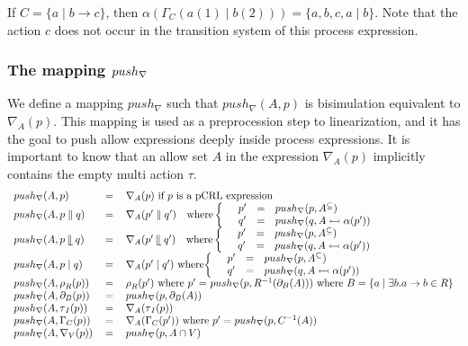 \documentclass{article}
\begin{document}
If $C=\{a\mid b\rightarrow c\}$, then $\alpha (\Gamma _{C}(a(1)\mid
b(2)))=\{a,b,c,a\mid b\}$. Note that the action $c$ does not occur in the
transition system of this process expression.

\subsubsection{The mapping $push_{\protect\nabla }$}

We define a mapping $push_{\nabla }$ such that $push_{\nabla }(A,p)$ is
bisimulation equivalent to $\nabla _{A}(p)$. This mapping is used as a
preprocession step to linearization, and it has the goal to push allow
expressions deeply inside process expressions. It is important to know that
an allow set $A$ in the expression $\nabla _{A}(p)$ implicitly contains the
empty multi action $\tau $.%
\[
\begin{tabular}{lll}
$push_{\nabla }(A,p)$ & $=$ & $\nabla _{A}(p)$ if $p$ is a pCRL expression
\\ 
$push_{\nabla }(A,p\parallel q)$ & $=$ & $\nabla _{A}(p^{\prime }\parallel
q^{\prime })\text{ where}\left\{ \text{ }%
\begin{array}{lll}
p^{\prime } & = & push_{\nabla }(p,A^{\subseteq }) \\ 
q^{\prime } & = & push_{\nabla }(q,A\leftarrowtail \alpha (p^{\prime }))%
\end{array}%
\right. $ \\ 
$push_{\nabla }(A,p\mathbin{\mathrel{\llfloor}}q)$ & $=$ & $\nabla
_{A}(p^{\prime }\mathbin{\mathrel{\llfloor}}q^{\prime })\text{ where}\left\{ 
\text{ }%
\begin{array}{lll}
p^{\prime } & = & push_{\nabla }(p,A^{\subseteq }) \\ 
q^{\prime } & = & push_{\nabla }(q,A\leftarrowtail \alpha (p^{\prime }))%
\end{array}%
\right. $ \\ 
$push_{\nabla }(A,p\mid q)$ & $=$ & $\nabla _{A}(p^{\prime }\mid q^{\prime
}) $ where$\left\{ \text{ }%
\begin{array}{lll}
p^{\prime } & = & push_{\nabla }(p,A^{\subseteq }) \\ 
q^{\prime } & = & push_{\nabla }(q,A\leftarrowtail \alpha (p^{\prime }))%
\end{array}%
\right. $ \\ 
$push_{\nabla }(A,\rho _{R}(p))$ & $=$ & $\rho _{R}(p^{\prime })$ where $%
p^{\prime }=$ $push_{\nabla }(p,R^{-1}(\partial _{B}(A)))$ where $B=\{a\mid
\exists b.a\rightarrow b\in R\}$ \\ 
$push_{\nabla }(A,\partial _{B}(p))$ & $=$ & $push_{\nabla }(p,\partial
_{B}(A))$ \\ 
$push_{\nabla }(A,\tau _{I}(p))$ & $=$ & $\nabla _{A}(\tau _{I}(p))$ \\ 
$push_{\nabla }(A,\Gamma _{C}(p))$ & $=$ & $\nabla _{A}(\Gamma
_{C}(p^{\prime }))$ where $p^{\prime }=push_{\nabla }(p,C^{-1}(A))$ \\ 
$push_{\nabla }(A,\nabla _{V}(p))$ & $=$ & $push_{\nabla }(p,A\cap V)$%
\end{tabular}%
\]
\end{document}
